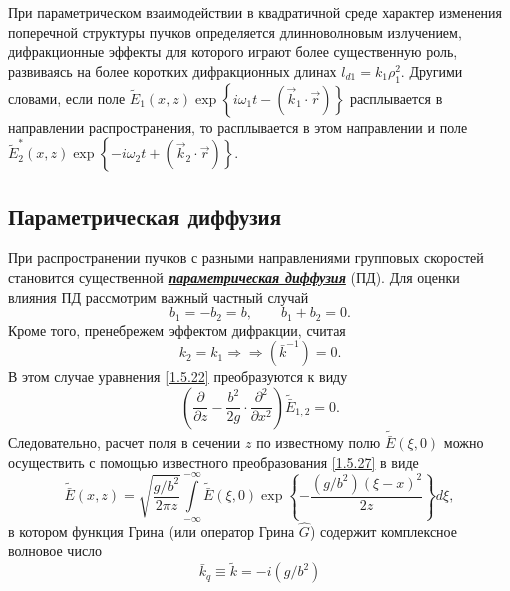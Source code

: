 \documentclass[a4paper]{article}
\begin{document}
При параметрическом взаимодействии в квадратичной среде характер изменения поперечной структуры пучков определяется длинноволновым излучением, дифракционные эффекты для которого играют более существенную роль, развиваясь на более коротких дифракционных длинах $l_{d1}=k_{1}\rho_{1}^{2}$. Другими словами, если поле $\tilde{E}_{1}(x,z)\exp\left\{i\omega_{1}t-\left(\vec{k}_{1}\cdot\vec{r}\right)\right\}$ расплывается в направлении распространения, то расплывается в этом направлении и поле \\ $\tilde{E}_{2}^{*}(x,z)\exp\left\{-i\omega_{2}t+\left(\vec{k}_{2}\cdot\vec{r}\right)\right\}$. 

\subsection{Параметрическая диффузия}

При распространении пучков с разными направлениями групповых скоростей становится существенной \textit{\textbf{\underline{параметрическая диффузия}}} (ПД). Для оценки влияния ПД рассмотрим важный частный случай 
\begin{equation}
	b_{1}=-b_{2}=b,\qquad b_{1}+b_{2}=0.
	\label{1.5.28}
\end{equation}
Кроме того, пренебрежем эффектом дифракции, считая
\begin{equation}
	k_{2}=k_{1}\Rightarrow\Rightarrow(\bar{k}^{-1})=0.
	\label{1.5.29}
\end{equation}
В этом случае уравнения \eqref{1.5.22} преобразуются к виду 
\begin{equation}
	\left(\frac{\partial}{\partial z}-\frac{b^{2}}{2g}\cdot\frac{\partial^{2}}{\partial x^{2}}\right)\tilde{\bar{E}}_{1,2}=0.
	\label{1.5.30}
\end{equation}
Следовательно, расчет поля в сечении $z$  по известному полю $\tilde{\bar{E}}(\xi,0)$  можно осуществить с помощью известного преобразования \eqref{1.5.27} в виде 
\begin{equation}
	\tilde{\bar{E}}(x,z)=\sqrt{\frac{g/b^{2}}{2\pi z}}\int\limits_{-\infty}^{-\infty}\tilde{\bar{E}}(\xi,0)\exp\left\{-\frac{(g/b^{2})(\xi-x)^{2}}{2z}\right\}d\xi,
	\label{1.5.31}
\end{equation}
в котором функция Грина (или оператор Грина $\hat{G}$) содержит комплексное волновое число 
\begin{equation}
	\bar{k}_{q}\equiv\tilde{k}=-i(g/b^{2})
\end{equation}
\end{document}
